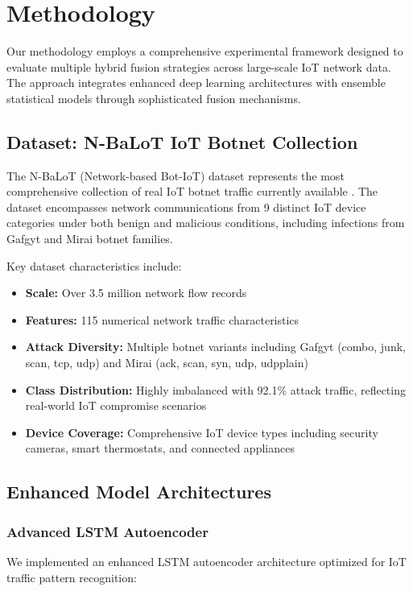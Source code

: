 \documentclass[conference]{IEEEtran}
\begin{document}
\section{Methodology}
Our methodology employs a comprehensive experimental framework designed to evaluate multiple hybrid fusion strategies across large-scale IoT network data. The approach integrates enhanced deep learning architectures with ensemble statistical models through sophisticated fusion mechanisms.

\subsection{Dataset: N-BaLoT IoT Botnet Collection}
The N-BaLoT (Network-based Bot-IoT) dataset represents the most comprehensive collection of real IoT botnet traffic currently available \cite{nbalot}. The dataset encompasses network communications from 9 distinct IoT device categories under both benign and malicious conditions, including infections from Gafgyt and Mirai botnet families.

Key dataset characteristics include:
\begin{itemize}
    \item \textbf{Scale:} Over 3.5 million network flow records
    \item \textbf{Features:} 115 numerical network traffic characteristics
    \item \textbf{Attack Diversity:} Multiple botnet variants including Gafgyt (combo, junk, scan, tcp, udp) and Mirai (ack, scan, syn, udp, udpplain)
    \item \textbf{Class Distribution:} Highly imbalanced with 92.1\% attack traffic, reflecting real-world IoT compromise scenarios
    \item \textbf{Device Coverage:} Comprehensive IoT device types including security cameras, smart thermostats, and connected appliances
\end{itemize}

\subsection{Enhanced Model Architectures}

\subsubsection{Advanced LSTM Autoencoder}
We implemented an enhanced LSTM autoencoder architecture optimized for IoT traffic pattern recognition:
\end{document}

